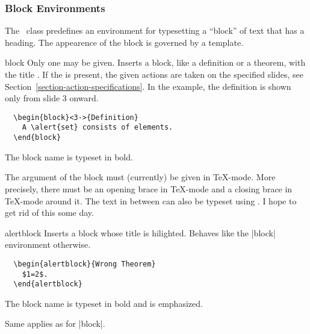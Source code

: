 \subsubsection{Block Environments}
\label{predefined}

The \beamer\ class predefines an environment for typesetting a
``block'' of text that has a heading. The appearence of the block is
governed by a template.

\begin{environment}{{block}}
  Only one  may be given.
  Inserts a block, like a definition or a theorem, with the title
  . If the  is present,
  the given actions are taken on the specified slides, see
  Section~\ref{section-action-specifications}. In the example, the 
  definition is shown only from slide 3 onward.
  \example
\begin{verbatim}
  \begin{block}<3->{Definition}
    A \alert{set} consists of elements.
  \end{block}
\end{verbatim}

  \articlenote
  The block name is typeset in bold.

  \lyxnote
  The argument of the block must (currently) be given in
  \TeX-mode. More precisely, there must be an opening brace in
  \TeX-mode and a closing brace in \TeX-mode around it. The text
  in between can also be typeset using \LyX. I hope to get rid of this
  some day.
\end{environment}


\begin{environment}{{alertblock}} 
  Inserts a block whose title is hilighted. Behaves like the |block|
  environment otherwise.
  \example
\begin{verbatim}
  \begin{alertblock}{Wrong Theorem}
    $1=2$.
  \end{alertblock}
\end{verbatim}

  \articlenote
  The block name is typeset in bold and is emphasized.

  \lyxnote
  Same applies as for |block|.
\end{environment}

